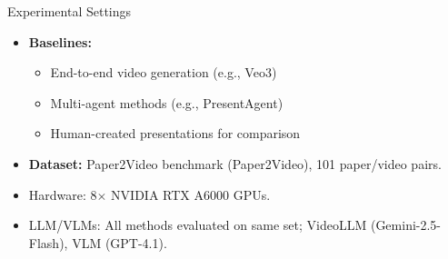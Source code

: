 \documentclass{beamer}
\newcommand{\alertterm}[1]{\alert{\textbf{#1}}}
\newcommand{\bench}{Paper2Video}
\begin{document}
\begin{frame}{Experimental Settings}
  \begin{itemize}
    \item \alertterm{Baselines:}
    \begin{itemize}
      \item End-to-end video generation (e.g., Veo3)
      \item Multi-agent methods (e.g., PresentAgent)
      \item Human-created presentations for comparison
    \end{itemize}
    
    \item \alertterm{Dataset:} Paper2Video benchmark (\bench), 101 paper/video pairs.
    \item Hardware: 8$\times$ NVIDIA RTX A6000 GPUs.
    \item LLM/VLMs: All methods evaluated on same set; VideoLLM (Gemini-2.5-Flash), VLM (GPT-4.1).
  \end{itemize}
\end{frame}
\end{document}
